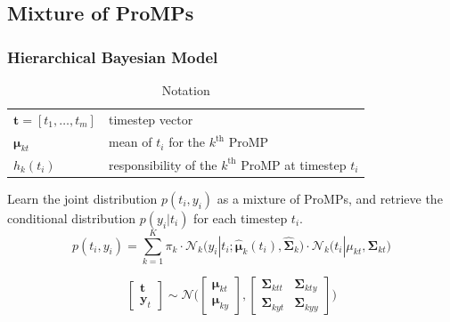 \documentclass{article}
\begin{document}
\subsection{Mixture of ProMPs}
\subsubsection{Hierarchical Bayesian Model}

\begin{table}
  \centering
  \caption{Notation}
  \begin{tabular}{ll}
    \toprule
    $\bm{t} = [t_{1}, \dots, t_{m}]$ & timestep vector\\
    $\bm{\mu}_{kt}$ & mean of $t_{i}$ for the $k^{\text{th}}$ ProMP\\
     $h_{k}(t_{i})$ & responsibility of the $k^{\text{th}}$ ProMP at timestep $t_{i}$\\
    \bottomrule
  \end{tabular}
\end{table}

Learn the joint distribution $p(t_{i}, y_{i})$ as a mixture of ProMPs, and retrieve the conditional distribution $p(y_{i}|t_{i})$ for each timestep $t_{i}$.
\begin{equation}
  p(t_{i}, y_{i}) = \sum_{k=1}^{K} \pi_{k} \cdot \mathcal{N}_{k}\big( y_{i}|t_{i}; \hat{\bm{\mu}}_{k}(t_{i}), \hat{\bm{\Sigma}}_{k} \big) \cdot \mathcal{N}_{k} \big( t_{i}|\mu_{kt}, \bm{\Sigma}_{kt} \big)
\end{equation}

\begin{equation}
  \begin{bmatrix}
    \bm{t}\\
    \bm{y}_t
  \end{bmatrix} \sim \mathcal{N}\Bigg(
  \begin{bmatrix}
    \bm{\mu}_{kt} \\[0.5em]
    \bm{\mu}_{ky}
  \end{bmatrix},
  \begin{bmatrix}
    \bm{\Sigma}_{ktt} & \bm{\Sigma}_{kty}\\[0.5em]
    \bm{\Sigma}_{kyt} & \bm{\Sigma}_{kyy}
  \end{bmatrix}
  \Bigg)
\end{equation}
\end{document}
